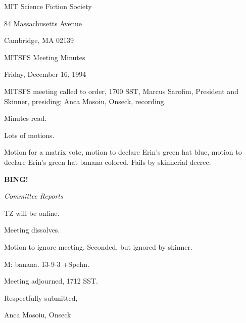 \documentclass[12pt]{article}
\newcommand{\bing}{{\bf BING!} }
\newcommand{\goto}[1]{\bing \vskip 12pt \centerline{{\em{#1}}}}
\begin{document}
\begin{center}

MIT Science Fiction Society 

84 Massachusetts Avenue

Cambridge, MA 02139

\vspace{12pt}

MITSFS Meeting Minutes 

Friday, December 16, 1994

\end{center}
 
\vspace{18pt}

\setlength{\parskip}{6pt}

\noindent
MITSFS meeting called to order, 1700 SST,
Marcus Sarofim, President and Skinner, presiding; Anca Mosoiu, Onseck, recording.

Minutes read.

Lots of motions.

Motion for a matrix vote, motion to declare Erin's green hat blue, motion to declare Erin's green hat banana colored. Fails by skinnerial decree.

\goto{Committee Reports}

TZ will be online.

Meeting dissolves.

Motion to ignore meeting. Seconded, but ignored by skinner.

M: banana. 13-9-3 +Spehn.

\vspace{12pt}

\noindent
Meeting adjourned, 1712 SST.

\vspace{18pt}

\centerline{Respectfully submitted,}
\centerline{Anca Mosoiu, Onseck}
\end{document}
